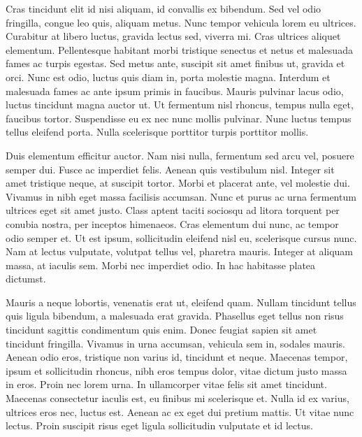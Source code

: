 Cras tincidunt elit id nisi aliquam, id convallis ex bibendum. Sed vel odio fringilla, congue leo quis, aliquam metus. Nunc tempor vehicula lorem eu ultrices. Curabitur at libero luctus, gravida lectus sed, viverra mi. Cras ultrices aliquet elementum. Pellentesque habitant morbi tristique senectus et netus et malesuada fames ac turpis egestas. Sed metus ante, suscipit sit amet finibus ut, gravida et orci. Nunc est odio, luctus quis diam in, porta molestie magna. Interdum et malesuada fames ac ante ipsum primis in faucibus. Mauris pulvinar lacus odio, luctus tincidunt magna auctor ut. Ut fermentum nisl rhoncus, tempus nulla eget, faucibus tortor. Suspendisse eu ex nec nunc mollis pulvinar. Nunc luctus tempus tellus eleifend porta. Nulla scelerisque porttitor turpis porttitor mollis.

Duis elementum efficitur auctor. Nam nisi nulla, fermentum sed arcu vel, posuere semper dui. Fusce ac imperdiet felis. Aenean quis vestibulum nisl. Integer sit amet tristique neque, at suscipit tortor. Morbi et placerat ante, vel molestie dui. Vivamus in nibh eget massa facilisis accumsan. Nunc et purus ac urna fermentum ultrices eget sit amet justo. Class aptent taciti sociosqu ad litora torquent per conubia nostra, per inceptos himenaeos. Cras elementum dui nunc, ac tempor odio semper et. Ut est ipsum, sollicitudin eleifend nisl eu, scelerisque cursus nunc. Nam at lectus vulputate, volutpat tellus vel, pharetra mauris. Integer at aliquam massa, at iaculis sem. Morbi nec imperdiet odio. In hac habitasse platea dictumst.

Mauris a neque lobortis, venenatis erat ut, eleifend quam. Nullam tincidunt tellus quis ligula bibendum, a malesuada erat gravida. Phasellus eget tellus non risus tincidunt sagittis condimentum quis enim. Donec feugiat sapien sit amet tincidunt fringilla. Vivamus in urna accumsan, vehicula sem in, sodales mauris. Aenean odio eros, tristique non varius id, tincidunt et neque. Maecenas tempor, ipsum et sollicitudin rhoncus, nibh eros tempus dolor, vitae dictum justo massa in eros. Proin nec lorem urna. In ullamcorper vitae felis sit amet tincidunt. Maecenas consectetur iaculis est, eu finibus mi scelerisque et. Nulla id ex varius, ultrices eros nec, luctus est. Aenean ac ex eget dui pretium mattis. Ut vitae nunc lectus. Proin suscipit risus eget ligula sollicitudin vulputate et id lectus.


